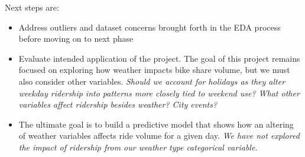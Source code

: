 \documentclass[]{article}
\begin{document}
Next steps are:

\begin{itemize}
\item
  Address outliers and dataset concerns brought forth in the EDA process
  before moving on to next phase
\item
  Evaluate intended application of the project. The goal of this project
  remains focused on exploring how weather impacts bike share volume,
  but we must also consider other variables. \emph{Should we account for
  holidays as they alter weekday ridership into patterns more closely
  tied to weekend use? What other variables affect ridership besides
  weather? City events?}
\item
  The ultimate goal is to build a predictive model that shows how an
  altering of weather variables affects ride volume for a given day.
  \emph{We have not explored the impact of ridership from our weather
  type categorical variable.}
\end{itemize}
\end{document}
